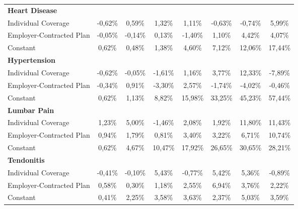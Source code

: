 \documentclass{article}
\begin{document}
\begin{table*}
{\begin{tabular}{l*{7}{c}}
\midrule
\textbf{Heart Disease}  & & & & & & & \\

Individual Coverage      & -0,62\%         &  0,59\%         &  1,32\%         &  1,11\%         & -0,63\%         & -0,74\%         &  5,99\%         \\
Employer-Contracted Plan & -0,05\%         & -0,14\%         &  0,13\%         & -1,40\%         &  1,10\%         &  4,42\%         &  4,07\%         \\
Constant                 &  0,62\%         &  0,48\%         &  1,38\%\sym{*}  &  4,60\%\sym{***}&  7,12\%\sym{***}& 12,06\%\sym{***}& 17,44\%\sym{***}\\

\midrule
\textbf{Hypertension}  & & & & & & & \\

Individual Coverage      & -0,62\%         & -0,05\%         & -1,61\%         &  1,16\%         &  3,77\%         & \cellcolor[gray]{0.9} 12,33\%\sym{*}  & -7,89\%         \\
Employer-Contracted Plan & -0,34\%         &  0,91\%         & -3,30\%         &  2,57\%         & -1,74\%         & -4,02\%         & -0,46\%         \\
Constant                 &  0,62\%         &  1,13\%\sym{**} &  8,82\%\sym{***}& 15,98\%\sym{***}& 33,25\%\sym{***}& 45,23\%\sym{***}& 57,44\%\sym{***}\\

\midrule
\textbf{Lumbar Pain}  & & & & & & & \\

Individual Coverage      &  1,23\%         &  5,00\%         & -1,46\%         &  2,08\%         &  1,92\%         & 11,80\%         & \cellcolor[gray]{0.9} 11,43\%\sym{*}  \\
Employer-Contracted Plan &  0,94\%         &  1,79\%         &  0,81\%         &  3,40\%         &  3,22\%         &  6,71\%         & \cellcolor[gray]{0.9} 10,74\%\sym{*}  \\
Constant                 &  0,62\%         &  4,67\%\sym{***}& 10,47\%\sym{***}& 17,92\%\sym{***}& 26,65\%\sym{***}& 30,65\%\sym{***}& 28,21\%\sym{***}\\

\midrule
\textbf{Tendonitis}  & & & & & & & \\

Individual Coverage      & -0,41\%         & -0,10\%         &  \cellcolor[gray]{0.9} 5,43\%\sym{*}  & -0,77\%         &  \cellcolor[gray]{0.9} 5,42\%\sym{*}  &  5,36\%         & -0,89\%         \\
Employer-Contracted Plan &  0,58\%         &  0,30\%         &  1,18\%         &  2,55\%         &  \cellcolor[gray]{0.9} 6,94\%\sym{***}&  3,76\%         &  2,22\%         \\
Constant                 &  0,41\%         &  2,25\%\sym{***}&  3,58\%\sym{***}&  3,63\%\sym{***}&  2,37\%\sym{**} &  5,03\%\sym{**} &  3,59\%\sym{**} \\


\end{tabular}}
\end{table*}
\end{document}
